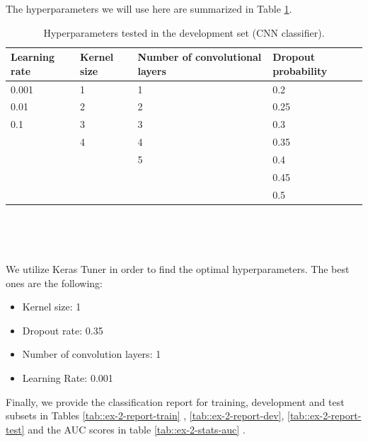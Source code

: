 \documentclass[10pt, a4paper]{article}
\begin{document}
 The hyperparameters we will use here are summarized in Table \ref{tab::ex-2-hyper}.
	
	\begin{table}
		\centering
		\begin{tabular}{|l|l|l|l|}
			\hline
			\rowcolor{blue!25}\textbf{Learning rate} & \cellcolor{blue!25}\textbf{Kernel size} & \cellcolor{blue!25}\textbf{Number of convolutional layers} & \cellcolor{blue!25}\textbf{Dropout probability} \\
			\hline
			0.001 & 1 & 1 & 0.2 \\
			\hline
			0.01 & 2 & 2 & 0.25 \\
			\hline
			0.1 & 3 & 3 & 0.3  \\
			\hline 
			& 4 & 4 & 0.35  \\
			\hline 
			& & 5 & 0.4 \\
			\hline 
			& & & 0.45 \\
			\hline 
			& & & 0.5 \\
			
			
			
			
			\hline
		\end{tabular}
		\caption{Hyperparameters tested in the development set (CNN classifier).}
		\label{tab::ex-2-hyper}
	\end{table}
	
	\ 
	
	
	\
	
	We utilize Keras Tuner in order to find the optimal hyperparameters. The best ones are the following:
	\begin{itemize}
		\item Kernel size: 1
		\item Dropout rate: 0.35
		\item Number of convolution layers: 1
		\item Learning Rate: 0.001
	\end{itemize}
 
 
 Finally, we provide the classification report for training, development and test subsets in Tables \ref{tab::ex-2-report-train} , \ref{tab::ex-2-report-dev}, \ref{tab::ex-2-report-test} and the AUC scores in table \ref{tab::ex-2-stats-auc} .
	
\end{document}
